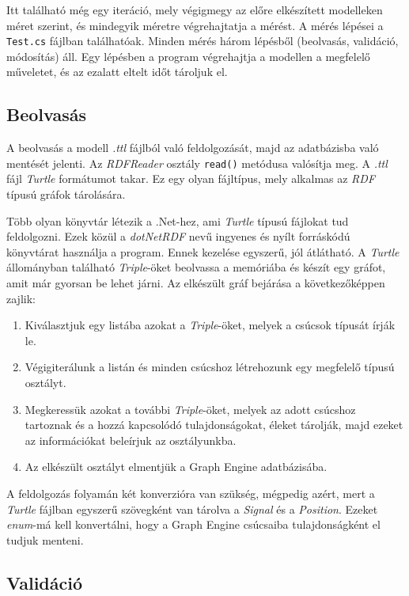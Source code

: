 Itt található még egy iteráció, mely végigmegy az előre elkészített modelleken méret szerint, és mindegyik méretre végrehajtatja a mérést. A mérés lépései a \texttt{Test.cs} fájlban találhatóak. Minden mérés három lépésből (beolvasás, validáció, módosítás) áll. Egy lépésben a program végrehajtja a modellen a megfelelő műveletet, és az ezalatt eltelt időt tároljuk el.

\subsection{Beolvasás}

A beolvasás a modell \emph{.ttl} fájlból való feldolgozását, majd az adatbázisba való mentését jelenti. Az \emph{RDFReader} osztály \texttt{read()} metódusa valósítja meg. A \emph{.ttl} fájl \emph{Turtle} formátumot takar. Ez egy olyan fájltípus, mely alkalmas az \emph{RDF} típusú gráfok tárolására. 

Több olyan könyvtár létezik a .Net-hez, ami \emph{Turtle} típusú fájlokat tud feldolgozni. Ezek közül a \emph{dotNetRDF} nevű ingyenes és nyílt forráskódú könyvtárat használja a program. Ennek kezelése egyszerű, jól átlátható. A \emph{Turtle} állományban található \emph{Triple}-öket beolvassa a memóriába és készít egy gráfot, amit már gyorsan be lehet járni. Az elkészült gráf bejárása a következőképpen zajlik:

\begin{enumerate}
	\item Kiválasztjuk egy listába azokat a \emph{Triple}-öket, melyek a csúcsok típusát írják le.
	\item Végigiterálunk a listán és minden csúcshoz létrehozunk egy megfelelő típusú osztályt.
	\item Megkeressük azokat a további \emph{Triple}-öket, melyek az adott csúcshoz tartoznak és a hozzá kapcsolódó tulajdonságokat, éleket tárolják, majd ezeket az információkat beleírjuk az osztályunkba.
	\item Az elkészült osztályt elmentjük a Graph Engine adatbázisába.
\end{enumerate}

A feldolgozás folyamán két konverzióra van szükség, mégpedig azért, mert a \emph{Turtle} fájlban egyszerű szövegként van tárolva a \emph{Signal} és a \emph{Position}. Ezeket \emph{enum}-má kell konvertálni, hogy a Graph Engine csúcsaiba tulajdonságként el tudjuk menteni.

\subsection{Validáció}


